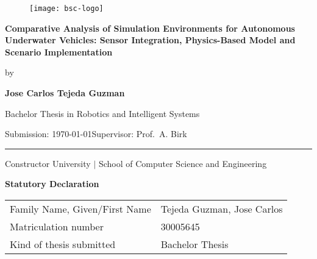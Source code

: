 \documentclass[]{article}
\newcommand{\mylastname}{Tejeda Guzman}
\newcommand{\myfirstname}{Jose Carlos}
\newcommand{\mynumber}{30005645}
\newcommand{\myname}{\myfirstname{} \mylastname{}}
\newcommand{\mytitle}{Comparative Analysis of Simulation Environments for Autonomous Underwater Vehicles: Sensor Integration, Physics-Based Model and Scenario Implementation}
\newcommand{\mysupervisor}{Prof.~A. Birk}
\begin{document}
	
	\thispagestyle{empty}
	
	\begin{flushright}
\begin{figure}
	\texttt{[image: bsc-logo]}
\end{figure}
	\end{flushright}
	\vspace*{40mm}
	\begin{center}
		\huge
		\textbf{\mytitle}
	\end{center}
	\vspace*{4mm}
	\begin{center}
		\Large by
	\end{center}
	\vspace*{4mm}
	\begin{center}
		\LARGE
		\textbf{\myname}
	\end{center}
	\vspace*{20mm}
	\begin{center}
		\Large
		Bachelor Thesis in Robotics and Intelligent Systems
	\end{center}
	\vfill
	\begin{flushleft}
		\large
		Submission: \today \hfill Supervisor: \mysupervisor \\
		\rule{\textwidth}{1pt}
	\end{flushleft}
	\begin{center}
		Constructor University $|$ School of Computer Science and Engineering
	\end{center}
	
	\newpage
	\thispagestyle{empty}
	
	\begin{center}
		\Large \textbf{Statutory Declaration}
		\vspace*{8mm}
	\end{center}
	
	\begin{center}
		\begin{tabular}{|l|p{85mm}|}
			\hline
			Family Name, Given/First Name & \mylastname, \myfirstname \\
			Matriculation number & \mynumber \\
			Kind of thesis submitted & Bachelor Thesis \\
			\hline
		\end{tabular}
		\vspace*{8mm}
	\end{center}
	
\end{document}
